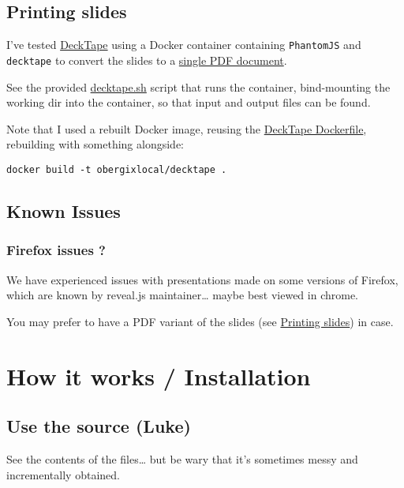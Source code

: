 \documentclass[a4paper]{article}
\begin{document}
\subsection{Printing slides}
\label{sec:orge20f777}

I've tested \href{https://github.com/astefanutti/decktape}{DeckTape} using a Docker container containing \texttt{PhantomJS} and
\texttt{decktape} to convert the slides to a \href{slides.pdf}{single PDF document}.

See the provided \href{bin/decktape.sh}{decktape.sh} script that runs the container, bind-mounting the
working dir into the container, so that input and output files can be
found.

Note that I used a rebuilt Docker image, reusing the \href{https://raw.githubusercontent.com/astefanutti/decktape/master/Dockerfile}{DeckTape
Dockerfile}, rebuilding with something alongside:
\begin{verbatim}
docker build -t obergixlocal/decktape .
\end{verbatim}

\subsection{Known Issues}
\label{sec:org886023b}

\subsubsection{Firefox issues ?}
\label{sec:orga4074fd}

We have experienced issues with presentations made on some versions of Firefox, which are known by reveal.js maintainer\ldots{} maybe best viewed in chrome.

You may prefer to have a PDF variant of the slides (see \hyperref[sec:orge20f777]{Printing slides}) in case.



\section{How it works / Installation}
\label{sec:org039a6a6}
\subsection{Use the source (Luke)}
\label{sec:org5b8ab09}

See the contents of the files\ldots{} but be wary that it's sometimes messy and incrementally obtained.
\end{document}
